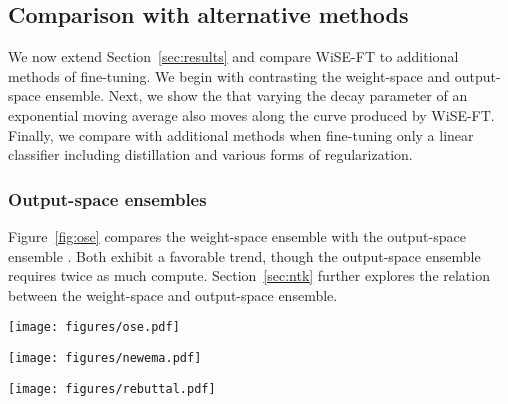 \subsection{Comparison with alternative methods}
\label{sec:baselines-appendix}

We now extend Section~\ref{sec:results} and compare WiSE-FT to additional methods of fine-tuning. We begin with contrasting the weight-space and output-space ensemble.
Next, we show the that varying the decay parameter of an exponential moving average also moves along the curve produced by WiSE-FT.
Finally, we compare with additional methods when fine-tuning only a linear classifier including distillation and various forms
of regularization.

\subsubsection{Output-space ensembles}

 Figure~\ref{fig:ose} compares the weight-space ensemble
   with the output-space ensemble . 
  Both exhibit a favorable trend, though the output-space ensemble requires twice as much compute. Section~\ref{sec:ntk} further explores the relation between the weight-space and output-space ensemble.

\begin{figure*}
    \centering
    \texttt{[image: figures/ose.pdf]}
    \caption{Comparing the weight-space ensemble  with the output-space ensemble  when fine-tuning end-to-end with learning rate . Note that the output-space ensemble requires 2x compute.} \label{fig:ose}
\end{figure*}

\FloatBarrier
\clearpage

\begin{figure*}
    \centering
    \texttt{[image: figures/newema.pdf]}
    \caption{Results for the debiased variant of EMA described in Appendix~\ref{sec:ema}. EMA improves accuracy on both ImageNet and on the distribution shifts, and further applying WiSE-FT to EMA solutions can improve robustness.
    The solutions with no EMA, decay 0.99, and decay 0.999 are overlapping in the plot, as are the solutions with decay 0.99999 and 0.999999.
    }\label{fig:ema0}
\end{figure*}

\begin{figure*}
    \centering
    \texttt{[image: figures/rebuttal.pdf]}
    \caption{Results for the variant of EMA biased towards the initialization, described in Appendix~\ref{sec:ema}.
    Varying the EMA decay  moves
    along the curve produced by WiSE-FT. Applying WiSE-FT to EMA solutions moves further along the curve
    produced by WiSE-FT.
    }\label{fig:ema1}
\end{figure*}

